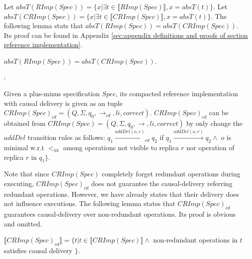 Let $absT(RImp(Spec)) = \{ x \vert \exists t \in \llbracket RImp(Spec) \rrbracket, x = absT(t) \}$. Let $absT(CRImp(Spec)) = \{ x \vert \exists t \in \llbracket CRImp(Spec) \rrbracket, x = absT(t) \}$. The following lemma stats that $absT(RImp(Spec)) = absT(CRImp(Spec))$. Its proof can be found in Appendix \ref{sec:appendix definitions and proofs of section reference implementation}.

\begin{lemma}
\label{lemma:RIMPSpec and CRIMPSpec have same abstract traces}
$absT(RImp(Spec)) = absT(CRImp(Spec))$.
\end{lemma}

:

Given a plus-minus specification $Spec$, its compacted reference implementation with causal delivery is given as an tuple $CRImp(Spec)_{\textit{cd}} = (Q,\Sigma,q_0,\rightarrow_{\textit{cd}},li,correct)$. $CRImp(Spec)_{\textit{cd}}$ can be obtained from $CRImp(Spec) = (Q,\Sigma,q_0,\rightarrow,li,correct)$ by only change the $addDel$  transition rules as follows: $q_1 {\xrightarrow{addDel(o,r)}}_{cd} q_2$ if $q_1 {\xrightarrow{addDel(o,r)}} q_2 \wedge $ $o$ is minimal w.r.t $<_{hb}$ among operations not visible to replica $r$ nor operation of replica $r$ in $q_1 \}$.

{\color {red}Note that since $CRImp(Spec)$ completely forget redundant operations during executing, $CRImp(Spec)_{\textit{cd}}$ does not guarantee the causal-delivery referring redundant operations. However, we have already states that their delivery does not influence executions.} The following lemma states that $CRImp(Spec)_{\textit{cd}}$ guarantees causal-delivery over non-redundant operations. Its proof is obvious and omitted.

\begin{lemma}
\label{lemma:CRImpcdSpec guarantees causal delivery for non-redundant operations}
$\llbracket CRImp(Spec)_{cd} \rrbracket = \{ t \vert t \in \llbracket CRImp(Spec) \rrbracket \wedge $ non-redundant operations in $t$ satisfies causal delivery $\}$.
\end{lemma}
























